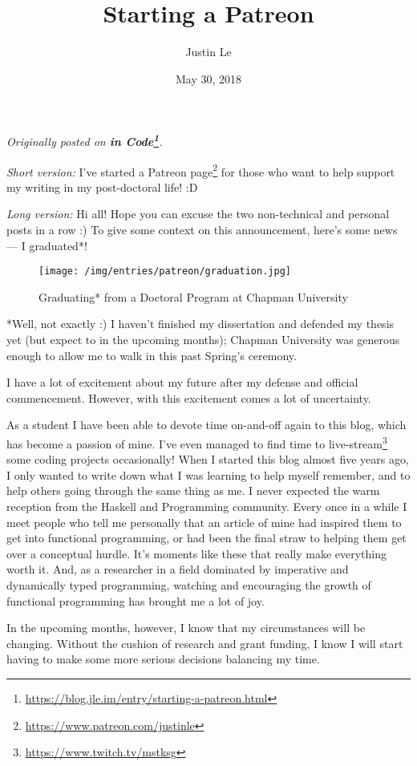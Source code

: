 \documentclass[]{article}
\title{Starting a Patreon}
\author{Justin Le}
\date{May 30, 2018}
\renewcommand{\href}[2]{#2\footnote{\url{#1}}}
\begin{document}
\maketitle

\emph{Originally posted on
\textbf{\href{https://blog.jle.im/entry/starting-a-patreon.html}{in Code}}.}

\emph{Short version:} I've \href{https://www.patreon.com/justinle}{started a
Patreon page} for those who want to help support my writing in my post-doctoral
life! :D

\emph{Long version:} Hi all! Hope you can excuse the two non-technical and
personal posts in a row :) To give some context on this announcement, here's
some news --- I graduated*!

\begin{figure}
\centering
\texttt{[image: /img/entries/patreon/graduation.jpg]}
\caption{Graduating* from a Doctoral Program at Chapman University}
\end{figure}

*Well, not exactly :) I haven't finished my dissertation and defended my thesis
yet (but expect to in the upcoming months); Chapman University was generous
enough to allow me to walk in this past Spring's ceremony.

I have a lot of excitement about my future after my defense and official
commencement. However, with this excitement comes a lot of uncertainty.

As a student I have been able to devote time on-and-off again to this blog,
which has become a passion of mine. I've even managed to find time to
\href{https://www.twitch.tv/mstksg}{live-stream} some coding projects
occasionally! When I started this blog almost five years ago, I only wanted to
write down what I was learning to help myself remember, and to help others going
through the same thing as me. I never expected the warm reception from the
Haskell and Programming community. Every once in a while I meet people who tell
me personally that an article of mine had inspired them to get into functional
programming, or had been the final straw to helping them get over a conceptual
hurdle. It's moments like these that really make everything worth it. And, as a
researcher in a field dominated by imperative and dynamically typed programming,
watching and encouraging the growth of functional programming has brought me a
lot of joy.

In the upcoming months, however, I know that my circumstances will be changing.
Without the cushion of research and grant funding, I know I will start having to
make some more serious decisions balancing my time.
\end{document}
